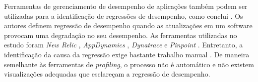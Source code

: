 

Ferramentas de gerenciamento de desempenho de aplicações também podem ser utilizadas para a identificação de regressões de desempenho, como conclui \citeauthor{Ahmed2016}. Os autores definem regressão de desempenho quando as atualizações em um software provocam uma degradação no seu desempenho. As ferramentas utilizadas no estudo foram \textit{New Relic} \cite{Relic2016}, \textit{AppDynamics} \cite{Appdynamics}, \textit{Dynatrace} \cite{Dynatrace2016} e \textit{Pinpoint} \cite{Pinpoint2016}. Entretanto, a identificação da causa da regressão exige bastante trabalho manual \cite{Ahmed2016}. De maneira semelhante às ferramentas de \textit{profiling}, o processo não é automático e não existem visualizações adequadas que esclareçam a regressão de desempenho.

